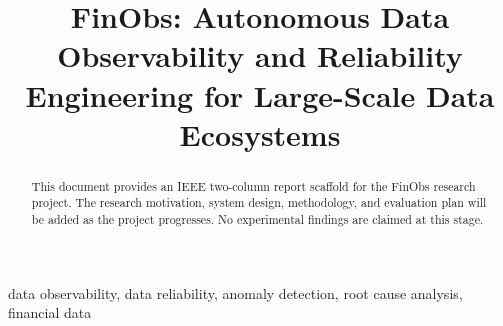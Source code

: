 \documentclass[conference]{IEEEtran}
\begin{document}
\title{FinObs: Autonomous Data Observability and Reliability Engineering for Large-Scale Data Ecosystems}

\author{
}

\maketitle

\begin{abstract}
This document provides an IEEE two-column report scaffold for the FinObs research project.
The research motivation, system design, methodology, and evaluation plan will be added
as the project progresses. No experimental findings are claimed at this stage.
\end{abstract}

\begin{IEEEkeywords}
data observability, data reliability, anomaly detection, root cause analysis, financial data
\end{IEEEkeywords}












\end{document}
